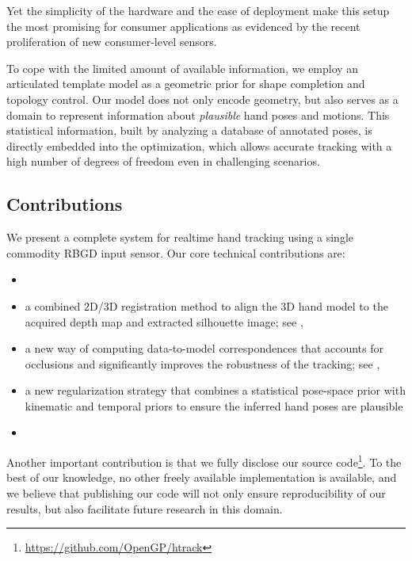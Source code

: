 Yet the simplicity of the hardware and the ease of deployment make this setup the most promising for consumer applications as evidenced by the recent proliferation of new consumer-level sensors.

To cope with the limited amount of available information, we employ an articulated template model as a geometric prior for shape completion and topology control. Our model does not only encode geometry, but also serves as a domain to represent information about \emph{plausible} hand poses and motions. This statistical information, built by analyzing a database of annotated poses, is directly embedded into the optimization, which
allows accurate tracking with a high number of degrees of freedom even in challenging scenarios.

\subsection*{Contributions}
% 
We present a complete system for realtime hand tracking using a single commodity RBGD input sensor. Our core technical contributions are:
% 


\begin {itemize}
\item {}
\item a combined 2D/3D registration method to align the 3D hand model to the acquired depth map and extracted silhouette image; see ,
\item a new way of computing data-to-model correspondences that accounts for occlusions and significantly improves the robustness of the tracking; see ,
\item a new regularization strategy that combines a statistical pose-space prior with kinematic and temporal priors to  ensure the inferred hand poses are plausible
\item {}
\end{itemize}

Another important contribution is that we fully disclose our source code\footnote{\url{https://github.com/OpenGP/htrack}}. To the best of our knowledge, no other freely available implementation is available, and we believe that publishing our code will not only ensure reproducibility of our results, but also facilitate future research in this domain.

